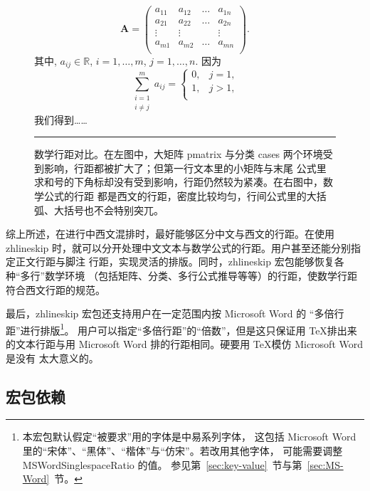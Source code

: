 \documentclass[zihao=5,no-math,a4paper]{ctexart}
\newcommand\pkg[1]{{\normalfont\ttfamily#1}}
\newcommand\opt[1]{{\normalfont\ttfamily#1}}
\newcommand\env[1]{{\normalfont\ttfamily#1}}
\begin{document}
\begin{figure}[h]
\begin{minipage}[t]{162pt}
\[
\symbf{A} = \begin{pmatrix}
a_{11} & a_{12} & \dotsc & a_{1n} \\
a_{21} & a_{22} & \dotsc & a_{2n} \\
\vdots & \vdots &        & \vdots \\
a_{m1} & a_{m2} & \dotsc & a_{mn} \\
\end{pmatrix}.
\]
其中, $a_{ij} \in \mathbb{R}$, $i=1,\dotsc,m$, $j=1,\dotsc,n$.
因为
\[
\sum_{\substack{i=1\\i\neq j}}^m a_{ij} = \begin{cases}
0, & j=1,\\
1, & j>1,\\
\end{cases}
\]
我们得到……
\end{minipage}\quad
\rule[\dimexpr-\dp0-0.5em\relax]{0.4pt}{\dimexpr{}++1em\relax}%
%
\caption[数学行距对比]{数学行距对比。在左图中，大矩阵 \env{pmatrix} 与分类
  \env{cases} 两个环境受到影响，行距都被扩大了；但第一行文本里的小矩阵与末尾
  公式里求和号的下角标却没有受到影响，行距仍然较为紧凑。在右图中，数学公式的行距
  都是西文的行距，密度比较均匀，行间公式里的大括弧、大括号也不会特别突兀。}
\label{fig:math-leading}
\end{figure}

综上所述，在进行中西文混排时，最好能够区分中文与西文的行距。在使用 \pkg{zhlineskip}
时，就可以分开处理中文文本与数学公式的行距。用户甚至还能分别指定正文行距与脚注
行距，实现灵活的排版。同时，\pkg{zhlineskip} 宏包能够恢复各种“多行”数学环境
（包括矩阵、分类、多行公式推导等等）的行距，使数学行距符合西文行距的规范。

最后，\pkg{zhlineskip} 宏包还支持用户在一定范围内按 Microsoft Word 的
“多倍行距”进行排版\footnote{本宏包默认假定“被要求”用的字体是中易系列字体，
这包括 Microsoft Word 里的“宋体”、“黑体”、“楷体”与“仿宋”。若改用其他字体，
可能需要调整 \opt{MSWordSinglespaceRatio} 的值。
参见第~\ref{sec:key-value}~节与第~\ref{sec:MS-Word}~节。}。
用户可以指定“多倍行距”的“倍数”，但是这只保证用 \TeX 排出来的文本行距与用
Microsoft Word 排的行距相同。硬要用 \TeX 模仿 Microsoft Word 是没有
太大意义的。

\subsection{宏包依赖}
\end{document}
